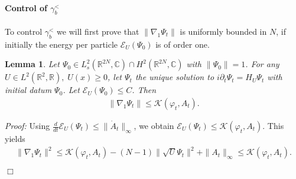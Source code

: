\documentclass[11pt, english, american]{article}
\newtheorem{lemma}[theorem]{Lemma}
\newenvironment{proof}{\emph{Proof:}}{\begin{flushright} $ \Box $ \end{flushright}}
\renewcommand{\phi}{\varphi}
\newcommand{\asalt}{\gamma^<_b}
\begin{document}
\paragraph{Control of $\asalt$} 
To control $\gamma_b^<$ we will first prove that $\| \nabla_1 \Psi_t \| $ is uniformly bounded in $N$, if initially the energy per particle $\mathcal{E}_{U}(\Psi_0)$ is of order one.

\begin{lemma} \label{kinenergyboundedlemma}
Let $\Psi_0 \in L^2_{s}(\mathbb{R}^{2N}, \mathbb{C}) \cap H^2(\mathbb{R}^{2N}, \mathbb{C})$ with $\|\Psi_0\|=1$. 
For any $U \in L^2(\mathbb{R}^2,\mathbb{R}) ,\; U(x) \geq 0$,
let $\Psi_t$ the unique solution to $i \partial_t \Psi_t
= H_{U} \Psi_t$ with initial datum $\Psi_0$.  
Let $\mathcal{E}_{U}(\Psi_0) \leq C$.
Then
\begin{align*}
\| \nabla_1 \Psi_t \| \leq \mathcal{K}(\phi_t, A_t) .
\end{align*}


\end{lemma}

\begin{proof}
Using 
$
 \frac{d}{dt}  \mathcal{E}_{U}(\Psi_t) \leq \| \dot A_t\|_\infty
$, we obtain $\mathcal{E}_{U}(\Psi_t)  \leq \mathcal{K}(\phi_t, A_t)$. 
This yields
\begin{align*}
\| \nabla_1 \Psi_t \|^2
\leq
\mathcal{K}(\phi_t, A_t)- (N-1) \| \sqrt{U}\Psi_t \|^2
+
\| A_t \|_\infty
\leq \mathcal{K}(\phi_t, A_t) .
\end{align*}

\end{proof}
\end{document}
